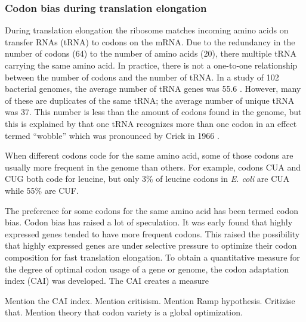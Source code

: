 \subsubsection{Codon bias during translation elongation}
During translation elongation the ribosome matches incoming amino acids on
transfer RNAs (tRNA) to codons on the mRNA. Due to the redundancy in the number
of codons (64) to the number of amino acids (20), there multiple tRNA carrying
the same amino acid. In practice, there is not a one-to-one relationship
between the number of codons and the number of tRNA. In a study of 102
bacterial genomes, the average number of tRNA genes was 55.6
\cite{rocha_codon_2004}. However, many of these are duplicates of the same
tRNA; the average number of unique tRNA was 37. This number is less than the
amount of codons found in the genome, but this is explained by that one tRNA
recognizes more than one codon in an effect termed ``wobble'' which was
pronounced by Crick in 1966 \cite{crick_codon--anticodon_1966}.

When different codons code for the same amino acid, some of those codons are
usually more frequent in the genome than others. For example, codons CUA and
CUG both code for leucine, but only 3\% of leucine codons in \textit{E. coli}
are CUA while 55\% are CUF.

The preference for some codons for the same amino acid has been termed codon
bias. Codon bias has raised a lot of speculation. It was early found that
highly expressed genes tended to have more frequent codons. This raised the
possibility that highly expressed genes are under selective pressure to
optimize their codon composition for fast translation elongation. To obtain a
quantitative measure for the degree of optimal codon usage of a gene or genome,
the codon adaptation index (CAI) was developed. The CAI creates a measure 

Mention the CAI index. Mention critisism. Mention Ramp hypothesis. Critizise
that. Mention theory that codon variety is a global optimization.
